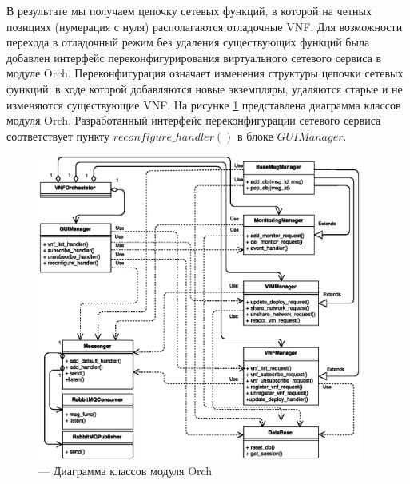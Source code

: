 \documentclass[oneside,final,14pt,a4paper]{extreport}
\begin{document}
В результате мы получаем цепочку сетевых функций, в которой на четных позициях (нумерация с нуля) располагаются отладочные VNF. Для возможности перехода в отладочный режим без удаления существующих функций была добавлен интерфейс переконфигурирования виртуального сетевого сервиса в модуле Orch. Переконфигурация означает изменения структуры цепочки сетевых функций, в ходе которой добавляются новые экземпляры, удаляются старые и не изменяются существующие VNF. На рисунке \ref{pic:orch_classes_diagram} представлена диаграмма классов модуля Orch. Разработанный интерфейс переконфигурации сетевого сервиса соответствует пункту $reconfigure\_handler()$ в блоке $GUIManager$.
\begin{figure}[h]
	\centering
	\includegraphics[width=0.95\textwidth]{orch_classes_diagram}
	\caption{--- Диаграмма классов модуля Orch}
	\label{pic:orch_classes_diagram}
\end{figure}
\end{document}
